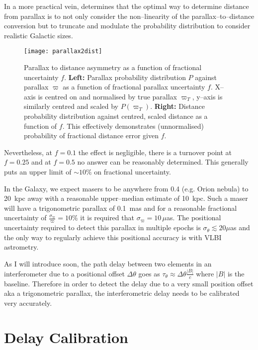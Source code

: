 		In a more practical vein, \citet{BailerJones2015} determines that the optimal way to determine distance from parallax is to not only consider the non--linearity of the parallax--to--distance conversion but to truncate and modulate the probability distribution to consider realistic Galactic sizes.			
		\begin{figure}
			\centering
			\texttt{[image: parallax2dist]}
			\caption[Parallax to distance asymmetry]{Parallax to distance asymmetry as a function of fractional uncertainty $f$. \textbf{Left:} Parallax probability distribution $P$ against parallax $\varpi$ as a function of fractional parallax uncertainty $f$. X--axis is centred on and normalised by true parallax $\varpi_T$, y--axis is similarly centred and scaled by $P(\varpi_T)$. \textbf{Right:} Distance probability distribution against centred, scaled distance as a function of $f$. This effectively demonstrates (unnormalised) probability of fractional distance error given $f$.} \label{fig:parallax2distance}
		\end{figure}
		Nevertheless, at $f=0.1$ the effect is negligible, there is a turnover point at $f=0.25$ and at $f=0.5$ no answer can be reasonably determined. This generally puts an upper limit of $\sim10\%$ on fractional uncertainty. 
	
	 	In the Galaxy, we expect masers to be anywhere from 0.4 (e.g. Orion nebula) to 20~kpc away \citep{Sanna2017} with a reasonable upper--median estimate of 10~kpc. Such a maser will have a trigonometric parallax of 0.1~mas and for a reasonable fractional uncertainty of $\frac{\sigma_\varpi}{\varpi}=10\%$ it is required that $\sigma_\varpi=10$\,$\mu$as. The positional uncertainty required to detect this parallax in multiple epochs is $\sigma_\theta\lesssim20\mu$as and the only way to regularly achieve this positional accuracy is with VLBI astrometry.
	 	
	 	As I will introduce soon, the path delay between two elements in an interferometer due to a positional offset $\Delta\theta$ goes as $\tau_\theta \approx \Delta\theta\frac{|B|}{c}$ where $|B|$ is the baseline. Therefore in order to detect the delay due to a very small position offset aka a trigonometric parallax, the interferometric delay needs to be calibrated very accurately. %
	 	
\section{Delay Calibration}	\label{sec:delaycalibration}
